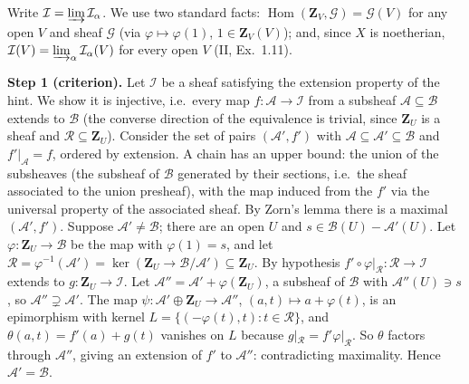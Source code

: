 \documentclass[11pt]{article}
\begin{document}
\pf
Write $\mathcal I=\varinjlim\mathcal I_\alpha$. We use two standard facts: $\operatorname{Hom}(\mathbf Z_V,\mathcal G)=\mathcal G(V)$ for any open $V$ and sheaf $\mathcal G$ (via $\varphi\mapsto\varphi(1)$, $1\in\mathbf Z_V(V)$); and, since $X$ is noetherian, $\mathcal I(V)=\varinjlim_\alpha\mathcal I_\alpha(V)$ for every open $V$ (II, Ex.~1.11).

\textbf{Step 1 (criterion).} Let $\mathcal I$ be a sheaf satisfying the extension property of the hint. We show it is injective, i.e.\ every map $f:\mathcal A\to\mathcal I$ from a subsheaf $\mathcal A\subseteq\mathcal B$ extends to $\mathcal B$ (the converse direction of the equivalence is trivial, since $\mathbf Z_U$ is a sheaf and $\mathcal R\subseteq\mathbf Z_U$). Consider the set of pairs $(\mathcal A',f')$ with $\mathcal A\subseteq\mathcal A'\subseteq\mathcal B$ and $f'|_{\mathcal A}=f$, ordered by extension. A chain has an upper bound: the union of the subsheaves (the subsheaf of $\mathcal B$ generated by their sections, i.e.\ the sheaf associated to the union presheaf), with the map induced from the $f'$ via the universal property of the associated sheaf. By Zorn's lemma there is a maximal $(\mathcal A',f')$. Suppose $\mathcal A'\ne\mathcal B$; there are an open $U$ and $s\in\mathcal B(U)-\mathcal A'(U)$. Let $\varphi:\mathbf Z_U\to\mathcal B$ be the map with $\varphi(1)=s$, and let $\mathcal R=\varphi^{-1}(\mathcal A')=\ker(\mathbf Z_U\to\mathcal B/\mathcal A')\subseteq\mathbf Z_U$. By hypothesis $f'\circ\varphi|_{\mathcal R}:\mathcal R\to\mathcal I$ extends to $g:\mathbf Z_U\to\mathcal I$. Let $\mathcal A''=\mathcal A'+\varphi(\mathbf Z_U)$, a subsheaf of $\mathcal B$ with $\mathcal A''(U)\ni s$, so $\mathcal A''\supsetneq\mathcal A'$. The map $\psi:\mathcal A'\oplus\mathbf Z_U\to\mathcal A''$, $(a,t)\mapsto a+\varphi(t)$, is an epimorphism with kernel $L=\{(-\varphi(t),t):t\in\mathcal R\}$, and $\theta(a,t)=f'(a)+g(t)$ vanishes on $L$ because $g|_{\mathcal R}=f'\varphi|_{\mathcal R}$. So $\theta$ factors through $\mathcal A''$, giving an extension of $f'$ to $\mathcal A''$: contradicting maximality. Hence $\mathcal A'=\mathcal B$.
\end{document}
